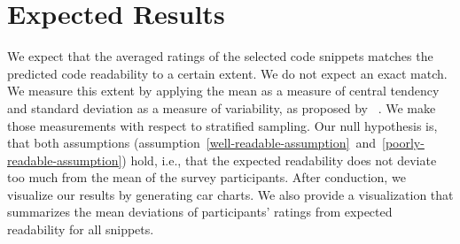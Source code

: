 \documentclass[%
class=scrreprt,
chapterprefix=false,%
open=right,%
twoside=false,%
paper=a4,%
logofile={Logo\_zentral\_farbig\_EN.png},%
thesistype=masterproposal,%
UKenglish,%
]{se2thesis}
\begin{document}
\section{Expected Results}
We expect that the averaged ratings of the selected code snippets matches the predicted code readability to a certain extent. We do not expect an exact match.
We measure this extent by applying the mean as a measure of central tendency and standard deviation as a measure of variability, as proposed by \citeauthor{linaker2015guidelines}~\cite{linaker2015guidelines}. We make those measurements with respect to stratified sampling.
Our null hypothesis is, that both assumptions (assumption~\ref{well-readable-assumption}~and~\ref{poorly-readable-assumption}) hold, i.e., that the expected readability does not deviate too much from the mean of the survey participants.
After conduction, we visualize our results by generating car charts. We also provide a visualization that summarizes the mean deviations of participants' ratings from expected readability for all snippets.
	
	\backmatter
	
	\printbibliography
	
\end{document}
